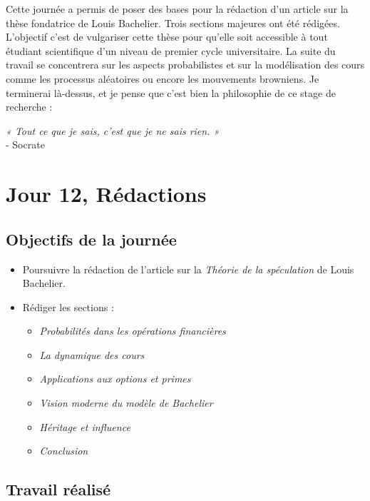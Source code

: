 \documentclass[a4paper,11pt]{article}
\begin{document}
Cette journée a permis de poser des bases pour la rédaction d’un article sur la thèse fondatrice de Louis Bachelier. Trois sections majeures ont été rédigées. L’objectif c'est de vulgariser cette thèse pour qu'elle soit accessible à tout étudiant scientifique d'un niveau de premier cycle universitaire. La suite du travail se concentrera sur les aspects probabilistes et sur la modélisation des cours comme les processus aléatoires ou encore les mouvements browniens. Je terminerai là-dessus, et je pense que c'est bien la philosophie de ce stage de recherche :
\begin{center}
    \large{\textit{« Tout ce que je sais, c’est que je ne sais rien. »}\\- Socrate}
\end{center}

\newpage


\section{Jour 12, Rédactions}

\subsection{Objectifs de la journée}
\begin{itemize}
    \item Poursuivre la rédaction de l’article sur la \textit{Théorie de la spéculation} de Louis Bachelier.
    \item Rédiger les sections :
    \begin{itemize}
        \item \textit{Probabilités dans les opérations financières}
        \item \textit{La dynamique des cours}
        \item \textit{Applications aux options et primes}
        \item \textit{Vision moderne du modèle de Bachelier}
        \item \textit{Héritage et influence}
        \item \textit{Conclusion}
    \end{itemize}
\end{itemize}

\subsection{Travail réalisé}
\end{document}
